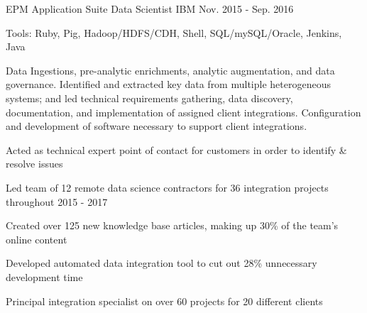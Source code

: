 \begin{cventries}
  \cvexpentry
    {EPM Application Suite} %
    {Data Scientist}
    {IBM}
    {Nov. 2015 - Sep. 2016}
    {
      \begin{cvheavyparagraph}
        Tools: Ruby, Pig, Hadoop/HDFS/CDH, Shell, SQL/mySQL/Oracle, Jenkins, Java
      \end{cvheavyparagraph}
    }
    {
      \begin{cvparagraph}
        Data Ingestions, pre-analytic enrichments, analytic augmentation, and data governance.  Identified and extracted key data from multiple heterogeneous systems; and led technical requirements gathering, data discovery, documentation, and implementation of assigned client integrations.  Configuration and development of software necessary to support client integrations.
      \end{cvparagraph}
      \begin{cvitems} %
        \item {Acted as technical expert point of contact for customers in order to identify \& resolve issues}
        \item {Led team of 12 remote data science contractors for 36 integration projects throughout 2015 - 2017}
        \item {Created over 125 new knowledge base articles, making up 30\% of the team's online content}
        \item {Developed automated data integration tool to cut out 28\% unnecessary development time}
        \item {Principal integration specialist on over 60 projects for 20 different clients}
      \end{cvitems}
    }


\end{cventries}
